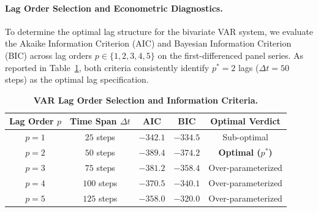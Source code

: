 \documentclass{article}
\theoremstyle{plain}
\theoremstyle{definition}
\begin{document}
\begin{table}[h]
\centering
\caption{\textbf{Augmented Dickey-Fuller (ADF) Unit-Root Stationarity Tests.}}
\label{tab:adf_stationarity}
\vskip 0.1in
\begin{small}
\begin{sc}
\end{sc}
\end{small}
\end{table}

\paragraph{Lag Order Selection and Econometric Diagnostics.}
To determine the optimal lag structure for the bivariate VAR system, we evaluate the Akaike Information Criterion (AIC) and Bayesian Information Criterion (BIC) across lag orders $p \in \{1, 2, 3, 4, 5\}$ on the first-differenced panel series. As reported in Table~\ref{tab:var_lag_selection}, both criteria consistently identify $p^* = 2$ lags ($\Delta t = 50$ steps) as the optimal lag specification.

\begin{table}[h]
\centering
\caption{\textbf{VAR Lag Order Selection and Information Criteria.}}
\label{tab:var_lag_selection}
\vskip 0.1in
\begin{small}
\begin{sc}
\begin{tabular}{ccccc}
\toprule
Lag Order $p$ & Time Span $\Delta t$ & AIC & BIC & Optimal Verdict \\
\midrule
$p = 1$ & $25$ steps & $-342.1$ & $-334.5$ & Sub-optimal \\
$p = 2$ & $50$ steps & $\mathbf{-389.4}$ & $\mathbf{-374.2}$ & \textbf{Optimal ($p^*$)} \\
$p = 3$ & $75$ steps & $-381.2$ & $-358.4$ & Over-parameterized \\
$p = 4$ & $100$ steps & $-370.5$ & $-340.1$ & Over-parameterized \\
$p = 5$ & $125$ steps & $-358.0$ & $-320.0$ & Over-parameterized \\
\bottomrule
\end{tabular}
\end{sc}
\end{small}
\end{table}
\end{document}
